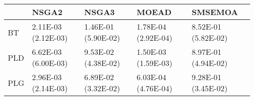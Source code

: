 \begin{tabular}{lllll}
\toprule
{} &                NSGA2 &                NSGA3 &                MOEAD &              SMSEMOA \\
\midrule
BT  &  2.11E-03 (2.12E-03) &  1.46E-01 (5.90E-02) &  1.78E-04 (2.92E-04) &  8.52E-01 (5.82E-02) \\
PLD &  6.62E-03 (6.00E-03) &  9.53E-02 (4.38E-02) &  1.50E-03 (1.59E-03) &  8.97E-01 (4.94E-02) \\
PLG &  2.96E-03 (2.14E-03) &  6.89E-02 (3.32E-02) &  6.03E-04 (4.76E-04) &  9.28E-01 (3.45E-02) \\
\bottomrule
\end{tabular}
